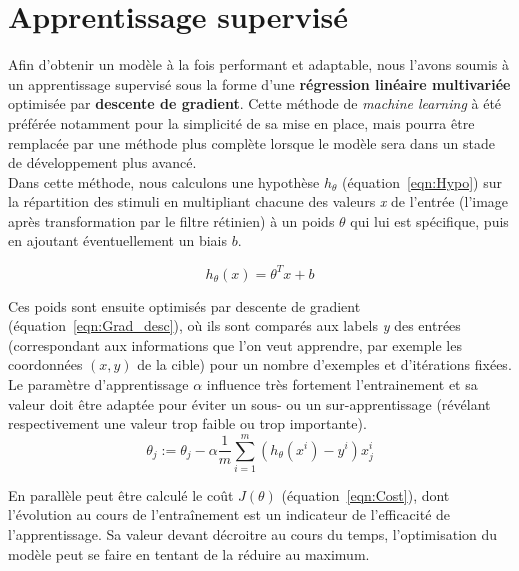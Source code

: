 
\section{Apprentissage supervisé} %

Afin d'obtenir un modèle à la fois performant et adaptable, nous l'avons soumis à un apprentissage supervisé sous la forme d'une \textbf{régression linéaire multivariée} optimisée par \textbf{descente de gradient}. Cette méthode de \textit{machine learning} à été préférée notamment pour la simplicité de sa mise en place, mais pourra être remplacée par une méthode plus complète lorsque le modèle sera dans un stade de développement plus avancé.\\
Dans cette méthode, nous calculons une hypothèse $h_{\theta}$ (équation~\ref{eqn:Hypo}) sur la répartition des stimuli en multipliant chacune des valeurs \textit{x} de l'entrée (l'image après transformation par le filtre rétinien) à un poids $\theta$ qui lui est spécifique, puis en ajoutant éventuellement un biais $b$.

\begin{equation}
h_{\theta}(x) = \theta^{T}x + b
\label{eqn:Hypo}
\end{equation}

Ces poids sont ensuite optimisés par descente de gradient (équation~\ref{eqn:Grad_desc}), où ils sont comparés aux labels \textit{y} des entrées (correspondant aux informations que l'on veut apprendre, par exemple les coordonnées $(x,y)$ de la cible) pour un nombre d'exemples et d'itérations fixées. Le paramètre d'apprentissage $\alpha$ influence très fortement l'entrainement et sa valeur doit être adaptée pour éviter un sous- ou un sur-apprentissage (révélant respectivement une valeur trop faible ou trop importante).\\

\begin{equation}
\theta_j := \theta_j - \alpha \frac{1}{m} \sum_{i=1}^m (h_\theta(x^i) - y^i)x_{j}^i
\label{eqn:Grad_desc}
\end{equation}

En parallèle peut être calculé le coût $J(\theta)$ (équation~\ref{eqn:Cost}), dont l'évolution au cours de l'entraînement est un indicateur de l'efficacité de l'apprentissage. Sa valeur devant décroitre au cours du temps, l'optimisation du modèle peut se faire en tentant de la réduire au maximum.

